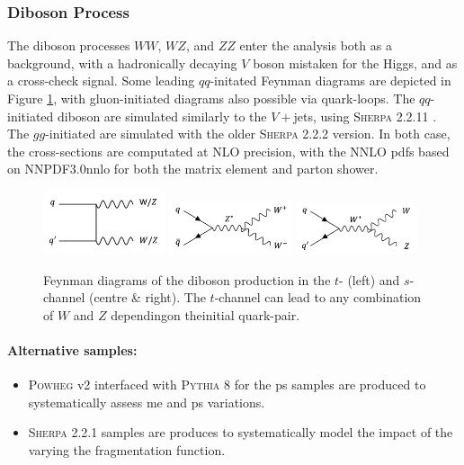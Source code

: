 \subsubsection{Diboson Process}
The diboson processes $WW$, $WZ$, and $ZZ$ enter the analysis both as a background, with a hadronically decaying $V$ boson mistaken for the Higgs, and as a cross-check signal. Some leading $qq$-initated Feynman diagrams are depicted in Figure \ref{fig:feyndiV}, with gluon-initiated diagrams also possible via quark-loops. The $qq$-initiated diboson are simulated similarly to the $V+$jets, using \textsc{Sherpa} 2.2.11 \cite{10.21468/SciPostPhys.7.3.034}. The $gg$-initiated are simulated with the older \textsc{Sherpa} 2.2.2 version. In both case, the cross-sections are computated at NLO precision, with the NNLO \gls{pdf}s based on NNPDF3.0nnlo \cite{PDFLHCrun2} for both the matrix element and parton shower.
\begin{figure}[h!]
  \center
  \includegraphics[width=0.32\textwidth]{Images/VH/Feynman/diboson.png}
  \includegraphics[width=0.32\textwidth]{Images/VH/Feynman/diW.png}
  \includegraphics[width=0.32\textwidth]{Images/VH/Feynman/diWZ.png}
  \caption{Feynman diagrams of the diboson production in the $t$- (left) and $s$-channel (centre \& right). The $t$-channel can lead to any combination of $W$ and $Z$ dependingon theinitial quark-pair.}
  \label{fig:feyndiV}
\end{figure}

\paragraph{Alternative samples:}
\begin{itemize}
  \item \textsc{Powheg} v2 interfaced with \textsc{Pythia} 8 for the \gls{ps} samples are produced to systematically assess \gls{me} and \gls{ps} variations. 
  \item \textsc{Sherpa} 2.2.1 samples are produces to systematically model the impact of the varying the fragmentation function.
\end{itemize}

